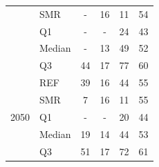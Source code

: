 \documentclass[11pt,twoside,a4paper,english]{article}
\begin{document}
\begin{appendices}
\begin{table}[htbp]
\begin{minipage}{\linewidth}
\begin{tabular}{l l | c c c c}
 & SMR & - & 16 & 11 & 54\\
 \cmidrule{2 - 6}
 & Q1 & - & - & 24 & 43\\
 & Median & - & 13 & 49 & 52\\
 & Q3 & 44 & 17 & 77 & 60\\
\toprule
\multirow{5}{*}{2050}
 & REF & 39 & 16 & 44 & 55\\
 & SMR & 7 & 16 & 11 & 55\\
 \cmidrule{2 - 6}
 & Q1 & - & - & 20 & 44\\
 & Median & 19 & 14 & 44 & 53\\
 & Q3 & 51 & 17 & 72 & 61\\
\bottomrule							
\end{tabular}
\end{minipage}
\end{table}


\end{appendices}
\end{document}

